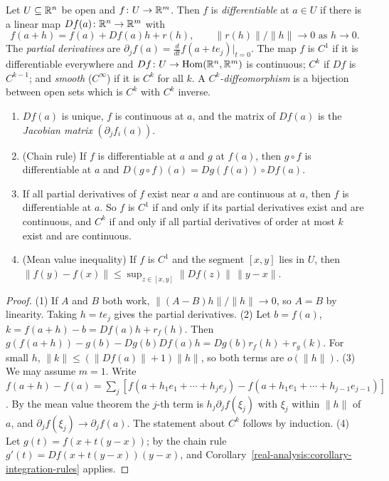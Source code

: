 \begin{definition}\label{real-analysis:definition-differentiable}
Let $U \subseteq \mathbb{R}^n$ be open and $f \colon U \to \mathbb{R}^m$. Then $f$ is \emph{differentiable} at $a \in U$ if there is a linear map $Df(a) \colon \mathbb{R}^n \to \mathbb{R}^m$ with
\[
f(a + h) = f(a) + Df(a)h + r(h), \qquad \|r(h)\|/\|h\| \to 0 \text{ as } h \to 0.
\]
The \emph{partial derivatives} are $\partial_jf(a) = \frac{d}{dt}f(a + te_j)|_{t=0}$. The map $f$ is $C^1$ if it is differentiable everywhere and $Df \colon U \to \operatorname{Hom}(\mathbb{R}^n, \mathbb{R}^m)$ is continuous; $C^k$ if $Df$ is
$C^{k-1}$; and \emph{smooth} ($C^\infty$) if it is $C^k$ for all $k$. A \emph{$C^k$-diffeomorphism} is a bijection between open sets which is $C^k$ with $C^k$ inverse.
\end{definition}

\begin{proposition}\label{real-analysis:proposition-derivative-basic}
\begin{enumerate}
\item $Df(a)$ is unique, $f$ is continuous at $a$, and the matrix of $Df(a)$ is the \emph{Jacobian matrix} $(\partial_jf_i(a))$.
\item (Chain rule) If $f$ is differentiable at $a$ and $g$ at $f(a)$, then $g \circ f$ is differentiable at $a$ and $D(g \circ f)(a) = Dg(f(a)) \circ Df(a)$.
\item If all partial derivatives of $f$ exist near $a$ and are continuous at $a$, then $f$ is differentiable at $a$. So $f$ is $C^1$ if and only if its partial derivatives exist and are continuous, and
$C^k$ if and only if all partial derivatives of order at most $k$ exist and are continuous.
\item (Mean value inequality) If $f$ is $C^1$ and the segment $[x, y]$ lies in $U$, then $\|f(y) - f(x)\| \leq \sup_{z \in [x, y]}\|Df(z)\|\,\|y - x\|$.
\end{enumerate}
\end{proposition}

\begin{proof}
(1) If $A$ and $B$ both work, $\|(A - B)h\|/\|h\| \to 0$, so $A = B$ by linearity. Taking $h = te_j$ gives the partial derivatives. (2) Let $b = f(a)$, $k = f(a + h) - b = Df(a)h + r_f(h)$. Then
$g(f(a + h)) - g(b) - Dg(b)Df(a)h = Dg(b)r_f(h) + r_g(k)$. For small $h$, $\|k\| \leq (\|Df(a)\| + 1)\|h\|$, so both terms are $o(\|h\|)$. (3) We may assume $m = 1$. Write
$f(a + h) - f(a) = \sum_j[f(a + h_1e_1 + \cdots + h_je_j) - f(a + h_1e_1 + \cdots + h_{j-1}e_{j-1})]$. By the mean value theorem the $j$-th term is $h_j\partial_jf(\xi_j)$ with $\xi_j$ within $\|h\|$ of $a$, and
$\partial_jf(\xi_j) \to \partial_jf(a)$. The statement about $C^k$ follows by induction. (4) Let $g(t) = f(x + t(y - x))$; by the chain rule $g'(t) = Df(x + t(y - x))(y - x)$, and
Corollary~\ref{real-analysis:corollary-integration-rules} applies.
\end{proof}

